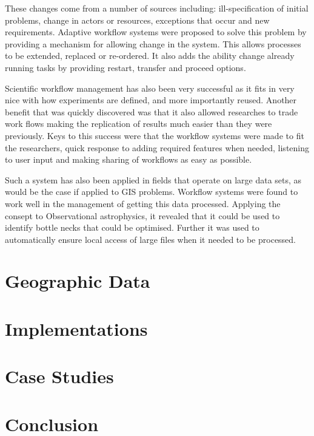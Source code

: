\documentclass[11pt,twocolumn]{article}
\begin{document}
    These changes come from a number of sources including:
    ill-specification of initial problems, change in actors
    or resources, exceptions that occur and new requirements.
    Adaptive workflow systems were proposed to solve this
    problem by providing a mechanism for allowing change in
    the system. This allows processes to be extended,
    replaced or re-ordered. It also adds the ability change
    already running tasks by providing restart, transfer and
    proceed options\cite{vanderAalst2002125}.

    Scientific workflow management has also been very
    successful as it fits in very nice with how experiments
    are defined, and more importantly reused. Another
    benefit that was quickly discovered was that it also
    allowed researches to trade work flows making the
    replication of results much easier than they were
    previously. Keys to this success were that the workflow
    systems were made to fit the researchers, quick response
    to adding required features when needed, listening
    to user input and making sharing of workflows as easy as
    possible\cite{4721191}.

    Such a system has also been applied in fields that
    operate on large data sets, as would be the case if
    applied to GIS problems. Workflow systems were found
    to work well in the management of getting this data
    processed. Applying the consept to Observational
    astrophysics, it revealed that it could be used
    to identify bottle necks that could be optimised.
    Further it was used to automatically ensure local
    access of large files when it needed to be processed.
    \cite{Aragon:2009:WMH:1529282.1529491}

\section{Geographic Data}

\section{Implementations}

\section{Case Studies}

\section{Conclusion}


{}

\end{document}
